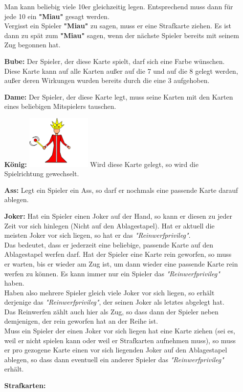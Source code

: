 \documentclass{article}
\begin{document}
\begin{itemize}
Man kann beliebig viele 10er gleichzeitig legen. Entsprechend muss dann für jede 10 ein \textbf{"Miau"} gesagt werden. \\ Vergisst ein Spieler \textbf{"Miau"} zu sagen, muss er eine Strafkarte ziehen. Es ist dann zu spät zum \textbf{"Miau"} sagen, wenn der nächste Spieler bereits mit seinem Zug begonnen hat.
\item[\textbf{Bube:}]
Der Spieler, der diese Karte spielt, darf sich eine Farbe wünschen. \\ Diese Karte kann auf alle Karten außer auf die 7 und auf die 8 gelegt werden, außer deren Wirkungen wurden bereits durch die eine 3 aufgehoben.
\item[\textbf{Dame:}]
Der Spieler, der diese Karte legt, muss seine Karten mit den Karten eines beliebigen Mitspielers tauschen.\item[\textbf{König:}]
\includegraphics[width=0.25\textwidth]{photos/king.png}
Wird diese Karte gelegt, so wird die Spielrichtung gewechselt.
\item[\textbf{Ass:}] Legt ein Spieler ein Ass, so darf er nochmals eine passende Karte darauf ablegen. 
\item[\textbf{Joker:}]
Hat ein Spieler einen Joker auf der Hand, so kann er diesen zu jeder Zeit vor sich hinlegen (Nicht auf den Ablagestapel). Hat er aktuell die meisten Joker vor sich liegen, so hat er das \textit{"Reinwerfprivileg"}. \\
Das bedeutet, dass er jederzeit eine beliebige, passende Karte auf den Ablagestapel werfen darf. Hat der Spieler eine Karte rein geworfen, so muss er warten, bis er wieder am Zug ist, um dann wieder eine passende Karte rein werfen zu können. Es kann immer nur ein Spieler das \textit{"Reinwerfprivileg"} haben. \\
Haben also mehrere Spieler gleich viele Joker vor sich liegen, so erhält derjenige das \textit{"Reinwerfprivileg"}, der seinen Joker als letztes abgelegt hat.  \\
Das Reinwerfen zählt auch hier als Zug, so dass dann der Spieler neben demjenigen, der rein geworfen hat an der Reihe ist. \\
Muss ein Spieler der einen Joker vor sich liegen hat eine Karte ziehen (sei es, weil er nicht spielen kann oder weil er Strafkarten aufnehmen muss), so muss er pro gezogene Karte einen vor sich liegenden Joker auf den Ablagestapel ablegen, so dass dann eventuell ein anderer Spieler das \textit{"Reinwerfprivileg"} erhält.
\item[\textbf{Strafkarten:}]
\begin{itemize}



\end{itemize}
\end{itemize}
\end{document}
